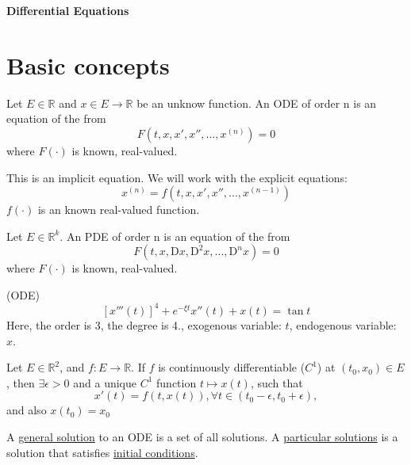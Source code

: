 \documentclass[twoside]{article}
\begin{document}

\begin{center}
  {\huge {\bf Differential Equations}}  
\end{center}
\section{Basic concepts}
\begin{definition}[ODE]
    Let $E \in \mathbb{R}$ and $ x \in E \rightarrow \mathbb{R}$ be an unknow function. An ODE of order n is an equation of the from
    $$F(t,x,x',x'', ... , x^{(n)}) = 0$$
    where $F(\cdot)$ is known, real-valued.
\end{definition}

This is an implicit equation. We will work with the explicit equations:
\[
x^{(n)} = f(t,x,x',x'', ... , x^{(n-1)})
\]
$f(\cdot)$ is an known real-valued function.

\begin{definition}[PDE]
    Let $E \in \mathbb{R}^k$. An PDE of order n is an equation of the from
    $$F(t,x, \mathrm{D} x,\mathrm{D}^2 x, ... , \mathrm{D}^{n}x) = 0$$
    where $F(\cdot)$ is known, real-valued.
\end{definition}

\begin{example} (ODE)
    \[
    [x'''(t)]^4 + e^{- \xi t} x''(t) + x(t) = \tan t
    \]
    Here, the order is 3, the degree is 4., exogenous variable: $t$, endogenous variable: $x$.
\end{example}

\begin{theorem}
    Let $E \in \mathbb{R}^2$, and $f: E \rightarrow \mathbb{R}$. If $f$ is continuously differentiable ($C^1$) at $(t_0, x_0) \in E$, then $\exists \epsilon > 0$ and a unique $C^1$ function $t \mapsto x(t)$, such that 
    $$x'(t) = f(t,x(t)), \forall t \in (t_0- \epsilon, t_0 + \epsilon),$$ and also $x(t_0) = x_0$
\end{theorem}

\begin{remark} 
    A \underline{general solution} to an ODE is a set of all solutions.
    A \underline{particular solutions} is a solution that satisfies \underline{initial conditions}.
\end{remark}
\end{document}
